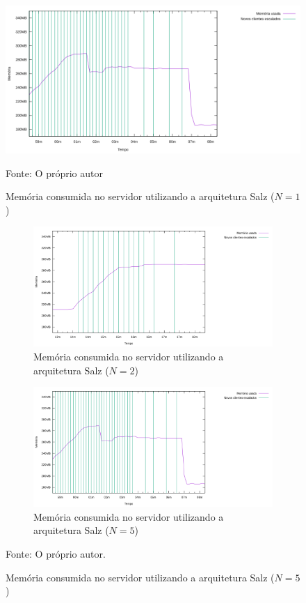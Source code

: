\begin{figure}[htb!]
  \caption{Memória consumida no servidor utilizando a arquitetura Salz ($N=1$)}
  \label{fig:rudy_t4_memory_used}
  \includegraphics[width=\textwidth]{metricas_salz_t2/memory_used.png}
  \centering
  
  Fonte: O próprio autor
\end{figure}


\begin{figure}[htb!]
  \caption{Memória consumida no servidor utilizando a arquitetura Salz ($N=2$ e $N=5$)}
  \centering
  \begin{subfigure}{1.0\textwidth}
    \centering
    \includegraphics[width=.9\textwidth]{metricas_salz_t3/memory_used.png}
    \caption{Memória consumida no servidor utilizando a arquitetura Salz ($N=2$)}
    \label{fig:rudy_t5_memory_used}
  \end{subfigure}


  \begin{subfigure}{1.0\textwidth}
    \centering
    \includegraphics[width=.9\textwidth]{metricas_salz_t2/memory_used.png}
    \caption{Memória consumida no servidor utilizando a arquitetura Salz ($N=5$)}
    \label{fig:rudy_t6_memory_used}
  \end{subfigure}
  \label{fig:rudy_t56_memory_used}

  Fonte: O próprio autor.
\end{figure}


